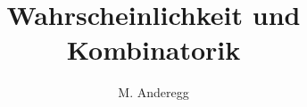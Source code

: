 \documentclass[a4paper, 11pt]{article}
\begin{document}
\title{Wahrscheinlichkeit und Kombinatorik}
\author{M. Anderegg}
\date{} %
\maketitle 




\clearpage

\clearpage

\clearpage

\clearpage

\clearpage





	
\end{document}
